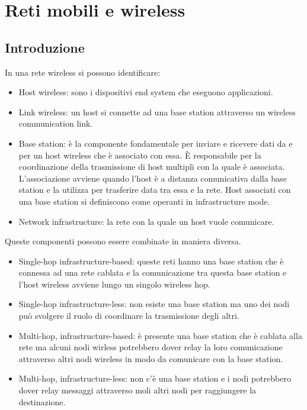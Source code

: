 \chapter{Reti mobili e wireless}
\section{Introduzione}
In  una rete wireless si possono identificare:
\begin{itemize}
\item Host wireless: sono i dispositivi end system che eseguono applicazioni.
\item Link wireless: un host si connette ad una base station attraverso un wireless communication link.
\item Base station: \`e la componente fondamentale per inviare e ricevere dati da e per un host wireless che \`e associato con essa. \`E responsabile per la coordinazione della trasmissione di host multipli con la
quale \`e associata. L'associazione avviene quando l'host \`e a distanza comunicativa dalla base station e la utilizza per trasferire data tra essa e la rete. Host associati con una base station si definiscono come 
operanti in infrastructure mode.  
\item Network infrastructure: la rete con la quale un host vuole comunicare.
\end{itemize}
Queste componenti possono essere combinate in maniera diversa.
\begin{itemize}
\item Single-hop infrastructure-based: queste reti hanno una base station che \`e connessa ad una rete cablata e la comunicazione tra questa base station e l'host wireless avviene lungo un singolo wireless hop.
\item Single-hop infrastructure-less: non esiste una base station ma uno dei nodi pu\`o svolgere il ruolo di coordinare la trasmissione degli altri.
\item Multi-hop, infrastructure-based: \`e presente una base station che \`e cablata alla rete ma alcuni nodi wirless potrebbero dover relay la loro comunicazione attraverso altri nodi wireless in modo da 
comunicare con la base station.
\item Multi-hop, infrastructure-less: non c'\`e una base station  e i nodi potrebbero dover relay messaggi attraverso moli altri nodi per raggiungere la destinazione. 
\end{itemize}
